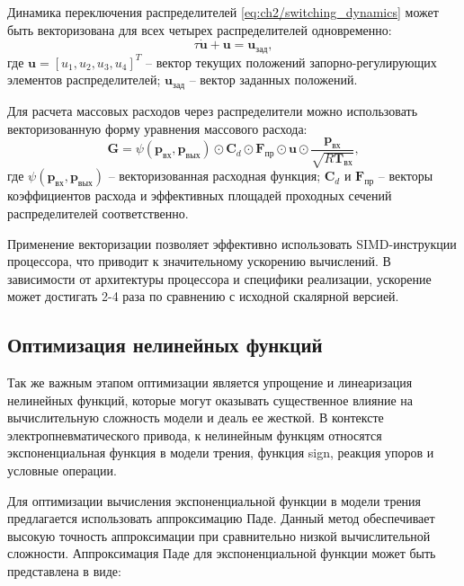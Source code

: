 Динамика переключения распределителей \eqref{eq:ch2/switching_dynamics} может быть векторизована для всех четырех распределителей одновременно:
\begin{equation}\label{eq:ch2/vec_switching}
    \tau \dot{\mathbf{u}} + \mathbf{u} = \mathbf{u}_\text{зад},
\end{equation}
где $\mathbf{u} = [u_1, u_2, u_3, u_4]^T$ -- вектор текущих положений запорно-регулирующих элементов распределителей;
$\mathbf{u}_\text{зад}$ -- вектор заданных положений.

Для расчета массовых расходов через распределители можно использовать векторизованную форму уравнения массового расхода:
\begin{equation}\label{eq:ch2/vec_mass_flow}
    \mathbf{G} = \psi(\mathbf{p}_\text{вх}, \mathbf{p}_\text{вых}) \odot \mathbf{C}_d \odot \mathbf{F}_\text{пр} \odot \mathbf{u} \odot \frac{\mathbf{p}_\text{вх}}{\sqrt{R\mathbf{T}_\text{вх}}},
\end{equation}
где $\psi(\mathbf{p}_\text{вх}, \mathbf{p}_\text{вых})$ -- векторизованная расходная функция;
$\mathbf{C}_d$ и $\mathbf{F}_\text{пр}$ -- векторы коэффициентов расхода и эффективных площадей проходных сечений распределителей соответственно.

Применение векторизации позволяет эффективно использовать SIMD-инструкции процессора,
что приводит к значительному ускорению вычислений. В зависимости от архитектуры процессора и
специфики реализации, ускорение может достигать 2-4 раза \cite*{tian2013simd} по сравнению с исходной скалярной версией.

\subsection{Оптимизация нелинейных функций}\label{sec:ch2/sec5/subsec2}

Так же важным этапом оптимизации является упрощение и линеаризация нелинейных функций,
которые могут оказывать существенное влияние на вычислительную сложность модели и деаль ее
жесткой. В контексте электропневматического привода, к нелинейным функцям относятся экспоненциальная
функция в модели трения, функция sign, реакция упоров и условные операции.

Для оптимизации вычисления экспоненциальной функции в модели трения предлагается использовать аппроксимацию Паде.
Данный метод обеспечивает высокую точность аппроксимации при сравнительно низкой вычислительной
сложности. Аппроксимация Паде для экспоненциальной функции может быть представлена в виде:

